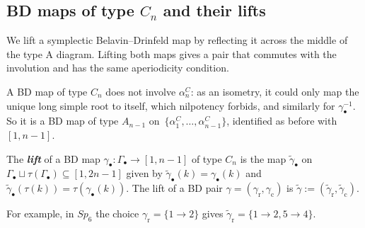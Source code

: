 \documentclass[a4paper]{amsart}
\numberwithin{equation}{section}
\theoremstyle{definition}
\theoremstyle{remark}
\newcommand{\tg}{\widetilde{\gamma}}
\newcommand{\rr}{\mathrm{r}}
\newcommand{\cc}{\mathrm{c}}
\newcommand{\newword}[1]{\textbf{\emph{#1}}}
\begin{document}
\subsection{BD maps of type \texorpdfstring{$C_n$}{Cn} and their lifts}
We lift a symplectic Belavin--Drinfeld map by reflecting it across the middle of the type A diagram.
Lifting both maps gives a pair that commutes with the involution and has the same aperiodicity condition.

A BD map of type $C_n$ does not involve $\alpha^C_n$: as an isometry, it could only map the unique long simple root to itself, which nilpotency forbids, and similarly for $\gamma_\bullet^{-1}$.
So it is a BD map of type $A_{n-1}$ on~$\{\alpha^C_1,\dots,\alpha^C_{n-1}\}$, identified as before with $[1,n-1]$.

\begin{definition}
  \label{def: lift}
  The \newword{lift} of a BD map $\gamma_\bullet:\Gamma_\bullet\to[1,n-1]$ of type $C_n$ is the map $\tg_\bullet$ on $\Gamma_\bullet\sqcup\tau(\Gamma_\bullet)\subseteq[1,2n-1]$ given by $\tg_\bullet(k)=\gamma_\bullet(k)$ and $\tg_\bullet(\tau(k))=\tau(\gamma_\bullet(k))$.
  The lift of a BD pair $\gamma=(\gamma_{\rr},\gamma_{\cc})$ is $\tg:=(\tg_{\rr},\tg_{\cc})$.
\end{definition}

For example, in $Sp_6$ the choice $\gamma_{\rr}=\{1\to2\}$ gives $\tg_{\rr}=\{1\to2,5\to4\}$.
\end{document}
